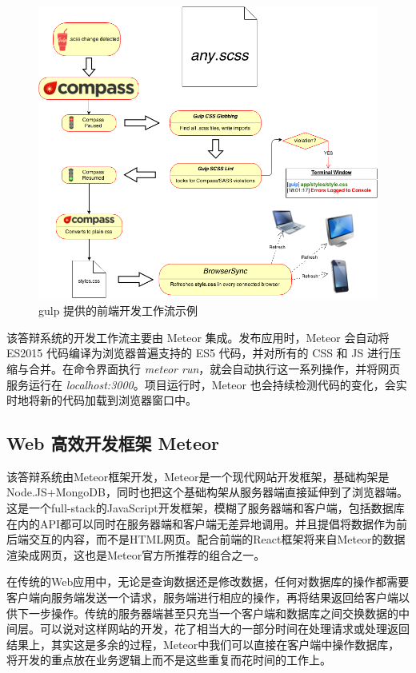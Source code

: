 \begin{figure}
	\centering
	\includegraphics[width=0.85\linewidth]{figure/gulp-flow-scss}
	\caption{gulp 提供的前端开发工作流示例}
\end{figure}

该答辩系统的开发工作流主要由 Meteor 集成。发布应用时，Meteor 会自动将 ES2015 代码编译为浏览器普遍支持的 ES5 代码，并对所有的 CSS 和 JS 进行压缩与合并。在命令界面执行 \textit{meteor run}，就会自动执行这一系列操作，并将网页服务运行在 \textit{localhost:3000}。项目运行时，Meteor 也会持续检测代码的变化，会实时地将新的代码加载到浏览器窗口中。


\subsection{Web 高效开发框架 Meteor}

该答辩系统由Meteor框架开发，Meteor是一个现代网站开发框架，基础构架是Node.JS+MongoDB，同时也把这个基础构架从服务器端直接延伸到了浏览器端。这是一个full-stack的JavaScript开发框架，模糊了服务器端和客户端，包括数据库在内的API都可以同时在服务器端和客户端无差异地调用。并且提倡将数据作为前后端交互的内容，而不是HTML网页。配合前端的React框架将来自Meteor的数据渲染成网页，这也是Meteor官方所推荐的组合之一。

在传统的Web应用中，无论是查询数据还是修改数据，任何对数据库的操作都需要客户端向服务端发送一个请求，服务端进行相应的操作，再将结果返回给客户端以供下一步操作。传统的服务器端甚至只充当一个客户端和数据库之间交换数据的中间层。可以说对这样网站的开发，花了相当大的一部分时间在处理请求或处理返回结果上，其实这是多余的过程，Meteor中我们可以直接在客户端中操作数据库，将开发的重点放在业务逻辑上而不是这些重复而花时间的工作上。

